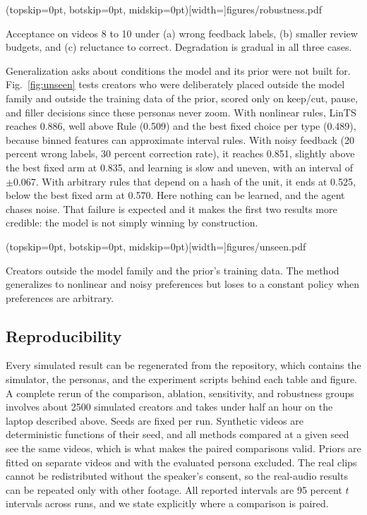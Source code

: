 \documentclass{ieeeaccess}
\begin{document}
\Figure[t!](topskip=0pt, botskip=0pt, midskip=0pt)[width=\textwidth]{figures/robustness.pdf}
{\parbox[t]{0.91\textwidth}{\raggedright Acceptance on videos 8 to 10 under (a) wrong feedback labels, (b) smaller review budgets, and (c) reluctance to correct. Degradation is gradual in all three cases.}\label{fig:robust}}

Generalization asks about conditions the model and its prior were not built for. Fig.~\ref{fig:unseen} tests creators who were deliberately placed outside the model family and outside the training data of the prior, scored only on keep/cut, pause, and filler decisions since these personas never zoom. With nonlinear rules, LinTS reaches 0.886, well above Rule (0.509) and the best fixed choice per type (0.489), because binned features can approximate interval rules. With noisy feedback (20 percent wrong labels, 30 percent correction rate), it reaches 0.851, slightly above the best fixed arm at 0.835, and learning is slow and uneven, with an interval of $\pm$0.067. With arbitrary rules that depend on a hash of the unit, it ends at 0.525, below the best fixed arm at 0.570. Here nothing can be learned, and the agent chases noise. That failure is expected and it makes the first two results more credible: the model is not simply winning by construction.

\Figure[t!](topskip=0pt, botskip=0pt, midskip=0pt)[width=\textwidth]{figures/unseen.pdf}
{\parbox[t]{0.91\textwidth}{\raggedright Creators outside the model family and the prior's training data. The method generalizes to nonlinear and noisy preferences but loses to a constant policy when preferences are arbitrary.}\label{fig:unseen}}

\subsection{Reproducibility}
Every simulated result can be regenerated from the repository, which contains the simulator, the personas, and the experiment scripts behind each table and figure. A complete rerun of the comparison, ablation, sensitivity, and robustness groups involves about 2500 simulated creators and takes under half an hour on the laptop described above. Seeds are fixed per run. Synthetic videos are deterministic functions of their seed, and all methods compared at a given seed see the same videos, which is what makes the paired comparisons valid. Priors are fitted on separate videos and with the evaluated persona excluded. The real clips cannot be redistributed without the speaker's consent, so the real-audio results can be repeated only with other footage. All reported intervals are 95 percent $t$ intervals across runs, and we state explicitly where a comparison is paired.
\end{document}
